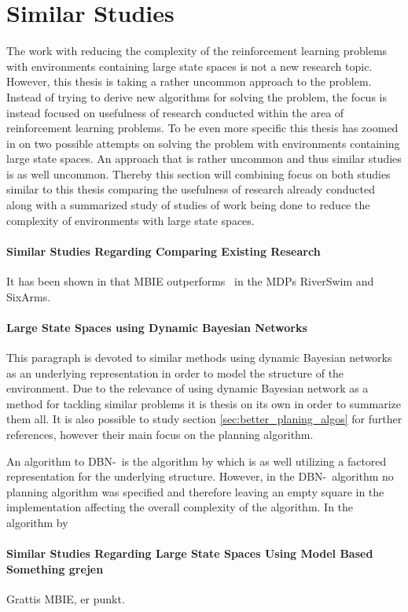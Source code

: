 \section{Similar Studies }
The work with reducing the complexity of the reinforcement learning problems with environments containing large state spaces is not a new research topic. However, this thesis is taking a rather uncommon approach to the problem. Instead of trying to derive new algorithms for solving the problem, the focus is instead focused on usefulness of research conducted within the area of reinforcement learning problems. To be even more specific this thesis has zoomed in on two possible attempts on solving the problem with environments containing large state spaces. An approach that is rather uncommon and thus similar studies is as well uncommon. 
Thereby this section will combining focus on both studies similar to this thesis comparing the usefulness of research already conducted along with a summarized study of studies of work being done to reduce the complexity of environments with large state spaces.


\paragraph{Similar Studies Regarding Comparing Existing Research}
It has been shown in \parencite{strehl2004empirical} that MBIE outperforms \etre\ in the MDPs RiverSwim and SixArms. \parencite{dietterich2013pac}


\paragraph{Large State Spaces using Dynamic Bayesian Networks}
This paragraph is devoted to similar methods using dynamic Bayesian networks as an underlying representation in order to model the structure of the environment. Due to the relevance of using dynamic Bayesian network as a method for tackling similar problems it is thesis on its own in order to summarize them all. It is also possible to study section \ref{sec:better_planing_algos} for further references, however their main focus on the planning algorithm.

An algorithm to DBN-\etre\ is the algorithm by \textcite{ross2012model} which is as well utilizing a factored representation for the underlying structure. However, in the DBN-\etre\ algorithm no planning algorithm was specified and therefore leaving an empty square in the implementation affecting the overall complexity of the algorithm. In the algorithm by \textcite{ross2012model} 


\paragraph{Similar Studies Regarding Large State Spaces Using Model Based Something grejen}
Grattis MBIE, er punkt.